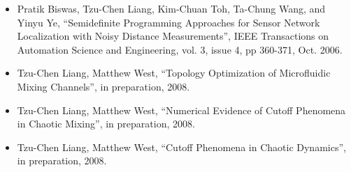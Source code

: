 \documentclass[12pt,t]{beamer}
\begin{document}
\begin{frame}
  \begin{itemize}
  \item Pratik Biswas, Tzu-Chen Liang, Kim-Chuan Toh, Ta-Chung Wang, and Yinyu Ye, “Semidefinite Programming Approaches for Sensor Network Localization with Noisy Distance Measurements”, IEEE Transactions on Automation Science and Engineering, vol. 3, issue 4, pp 360-371, Oct. 2006.
  \item Tzu-Chen Liang, Matthew West, “Topology Optimization of Microfluidic Mixing Channels”, in preparation, 2008.
  \item Tzu-Chen Liang, Matthew West, “Numerical Evidence of Cutoff Phenomena in Chaotic Mixing”, in preparation, 2008.
  \item Tzu-Chen Liang, Matthew West, “Cutoff Phenomena in Chaotic Dynamics”, in preparation, 2008.
  \end{itemize}
\end{frame}
\end{document}
